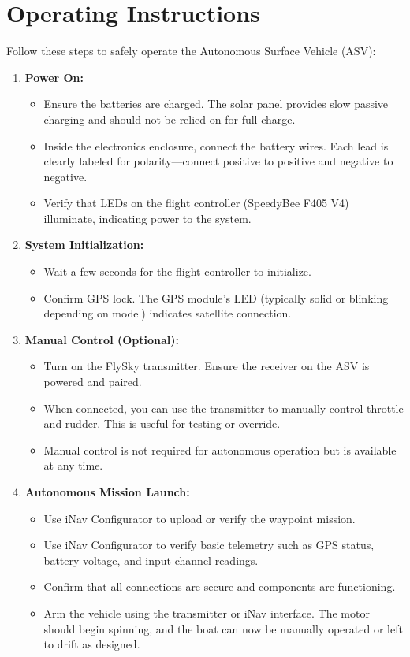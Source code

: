 \section{Operating Instructions}

Follow these steps to safely operate the Autonomous Surface Vehicle (ASV):

\begin{enumerate}
    \item \textbf{Power On:}
    \begin{itemize}
        \item Ensure the batteries are charged. The solar panel provides slow passive charging and should not be relied on for full charge.
        \item Inside the electronics enclosure, connect the battery wires. Each lead is clearly labeled for polarity—connect positive to positive and negative to negative.
        \item Verify that LEDs on the flight controller (SpeedyBee F405 V4) illuminate, indicating power to the system.
    \end{itemize}

    \item \textbf{System Initialization:}
    \begin{itemize}
        \item Wait a few seconds for the flight controller to initialize.
        \item Confirm GPS lock. The GPS module's LED (typically solid or blinking depending on model) indicates satellite connection.
    \end{itemize}

    \item \textbf{Manual Control (Optional):}
    \begin{itemize}
        \item Turn on the FlySky transmitter. Ensure the receiver on the ASV is powered and paired.
        \item When connected, you can use the transmitter to manually control throttle and rudder. This is useful for testing or override.
        \item Manual control is not required for autonomous operation but is available at any time.
    \end{itemize}

    \item \textbf{Autonomous Mission Launch:}
    \begin{itemize}
        \item Use iNav Configurator to upload or verify the waypoint mission.
        \item Use iNav Configurator to verify basic telemetry such as GPS status, battery voltage, and input channel readings.
        \item Confirm that all connections are secure and components are functioning.
        \item Arm the vehicle using the transmitter or iNav interface. The motor should begin spinning, and the boat can now be manually operated or left to drift as designed.
    \end{itemize}


\end{enumerate}
